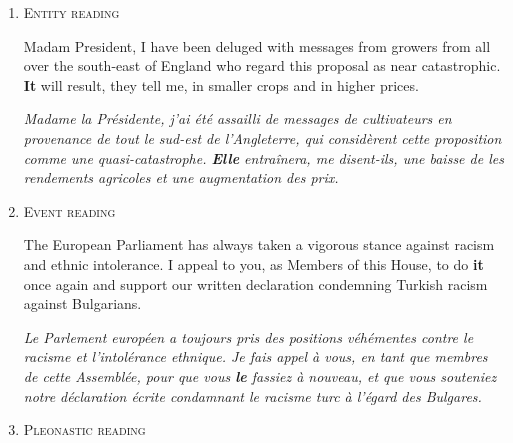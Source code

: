 \documentclass[10pt, a4paper]{article} \usepackage{lrec} \usepackage{multibib}
\begin{document}
%

\begin{enumerate}

\item\label{ex:nominal} \textsc{Entity reading}

Madam President, I have been deluged with messages from growers from all over 
the south-east of England who regard this proposal as near catastrophic. 
\textbf{It} will result, they tell me, in smaller crops and in higher prices. 

\textit{Madame la Présidente, j'ai été assailli de messages de cultivateurs 
en provenance de tout le sud-est de l'Angleterre, qui considèrent cette 
proposition comme une quasi-catastrophe. \textbf{Elle} entraînera, me 
disent-ils, une baisse de les rendements agricoles et une augmentation des 
prix.}



\item\label{ex:event}\textsc{Event reading}

The European Parliament has always taken a vigorous stance against racism and
ethnic intolerance. I appeal to you, as Members of this House, to do
\textbf{it} once again and support our written declaration condemning Turkish racism against Bulgarians.

\textit{Le Parlement européen a toujours pris des positions véhémentes contre le racisme
et l'intolérance ethnique. Je fais appel à vous, en tant que membres de cette
Assemblée, pour que vous \textbf{le} fassiez à nouveau, et que vous souteniez notre
déclaration écrite condamnant le racisme turc à l'égard des Bulgares.} 



\item\label{ex:pleo} \textsc{Pleonastic reading}


\end{enumerate}
\end{document}
